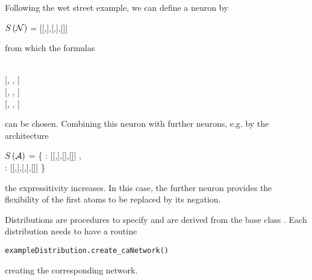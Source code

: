 \begin{example}
    Following the wet street example, we can define a neuron by
    \begin{centeredscript}
        $S\left(\mathcal{N}\right)$ = [[,],[,],[]]
    \end{centeredscript}
    from which the formulas
    \begin{centeredscript}
         \\
		\hspace{0.25cm} [, , ] \\
		\hspace{1cm}[, , ] \\
		\hspace{1cm}[, , ]
    \end{centeredscript}
    can be chosen.
    Combining this neuron with further neurons, e.g. by the architecture
    \begin{centeredscript}
        $S\left(\mathcal{A}\right)$ = \{ : [[,],[],[]] , \\
		\hspace{1.8cm}: [[,],[,],[]] \}
    \end{centeredscript}
    the expressitivity increases.
    In this case, the further neuron provides the flexibility of the first atoms to be replaced by its negation.
\end{example}




Distributions are procedures to specify  and are derived from the base class .
Each distribution needs to have a routine
\begin{lstlisting}
exampleDistribution.create_caNetwork()
\end{lstlisting}
creating the corresponding network.

